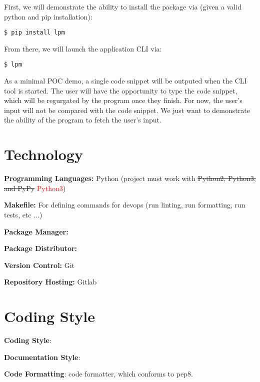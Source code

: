 \documentclass{article}
\begin{document}
\noindent First, we will demonstrate the ability to install the package via (given a valid python and pip installation):

\begin{lstlisting}
$ pip install lpm
\end{lstlisting}

\noindent From there, we will launch the application CLI via:

\begin{lstlisting}
$ lpm
\end{lstlisting}

\noindent As a minimal POC demo, a single code snippet will be outputed when the CLI tool is started. The user will have the opportunity to type the code snippet, which will be regurgated by the program once they finish. For now, the user's input will not be compared with the code snippet. We just want to demonstrate the ability of the program to fetch the user's input.

\section{Technology}

\noindent \textbf{Programming Languages:} Python (project must work with \sout{Python2, Python3, and PyPy} \textcolor{red}{Python3})

\noindent \textbf{Makefile:} For defining commands for devops (run linting, run formatting, run tests, etc ...)

\noindent \textbf{Package Manager:} \href{https://pypi.org/project/pip/}{\color{blue}{pip}}

\noindent \textbf{Package Distributor:} \href{https://pypi.org/}{\color{blue}{PyPI}}

\noindent \textbf{Version Control:} Git

\noindent \textbf{Repository Hosting:} Gitlab

\section{Coding Style}

\noindent \textbf{Coding Style}: \href{https://www.python.org/dev/peps/pep-0008/}{\color{blue}{pep8}}

\noindent \textbf{Documentation Style}: \href{https://numpydoc.readthedocs.io/en/latest/}{\color{blue}{numpydoc}}

\noindent \textbf{Code Formatting}: \href{https://black.readthedocs.io/en/stable/}{\color{blue}{black}} code formatter, which conforms to pep8.
\end{document}
